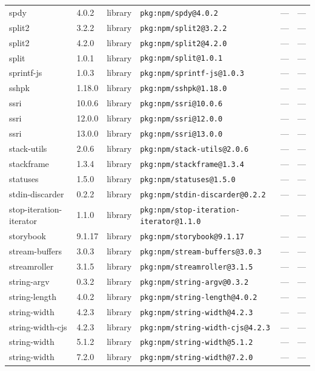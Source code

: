 \documentclass[11pt]{article}
\begin{document}
\begin{longtable}{|l|l|l|p{2.2cm}|l|p{4cm}|}
spdy & 4.0.2 & library & \texttt{pkg:npm/spdy@4.0.2} & — & — \\
split2 & 3.2.2 & library & \texttt{pkg:npm/split2@3.2.2} & — & — \\
split2 & 4.2.0 & library & \texttt{pkg:npm/split2@4.2.0} & — & — \\
split & 1.0.1 & library & \texttt{pkg:npm/split@1.0.1} & — & — \\
sprintf-js & 1.0.3 & library & \texttt{pkg:npm/sprintf-js@1.0.3} & — & — \\
sshpk & 1.18.0 & library & \texttt{pkg:npm/sshpk@1.18.0} & — & — \\
ssri & 10.0.6 & library & \texttt{pkg:npm/ssri@10.0.6} & — & — \\
ssri & 12.0.0 & library & \texttt{pkg:npm/ssri@12.0.0} & — & — \\
ssri & 13.0.0 & library & \texttt{pkg:npm/ssri@13.0.0} & — & — \\
stack-utils & 2.0.6 & library & \texttt{pkg:npm/stack-utils@2.0.6} & — & — \\
stackframe & 1.3.4 & library & \texttt{pkg:npm/stackframe@1.3.4} & — & — \\
statuses & 1.5.0 & library & \texttt{pkg:npm/statuses@1.5.0} & — & — \\
stdin-discarder & 0.2.2 & library & \texttt{pkg:npm/stdin-discarder@0.2.2} & — & — \\
stop-iteration-iterator & 1.1.0 & library & \texttt{pkg:npm/stop-iteration-iterator@1.1.0} & — & — \\
storybook & 9.1.17 & library & \texttt{pkg:npm/storybook@9.1.17} & — & — \\
stream-buffers & 3.0.3 & library & \texttt{pkg:npm/stream-buffers@3.0.3} & — & — \\
streamroller & 3.1.5 & library & \texttt{pkg:npm/streamroller@3.1.5} & — & — \\
string-argv & 0.3.2 & library & \texttt{pkg:npm/string-argv@0.3.2} & — & — \\
string-length & 4.0.2 & library & \texttt{pkg:npm/string-length@4.0.2} & — & — \\
string-width & 4.2.3 & library & \texttt{pkg:npm/string-width@4.2.3} & — & — \\
string-width-cjs & 4.2.3 & library & \texttt{pkg:npm/string-width-cjs@4.2.3} & — & — \\
string-width & 5.1.2 & library & \texttt{pkg:npm/string-width@5.1.2} & — & — \\
string-width & 7.2.0 & library & \texttt{pkg:npm/string-width@7.2.0} & — & — \\

\end{longtable}
\end{document}

